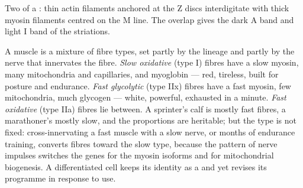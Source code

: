 \begin{omfigure}

{\small Two  of a : thin actin filaments anchored
at the Z discs interdigitate with thick myosin filaments centred on
the M line. The overlap gives the dark A band and light I band of
the striations.}
\end{omfigure}

\begin{proposition}\label{prop:b2:cell-differentiation:types}
A muscle is a mixture of fibre types, set partly by the 
lineage and partly by the nerve that innervates the fibre.
\emph{Slow oxidative} (type I) fibres have a slow myosin, many
mitochondria and capillaries, and myoglobin --- red, tireless,
built for posture and endurance. \emph{Fast glycolytic} (type IIx)
fibres have a fast myosin, few mitochondria, much glycogen ---
white, powerful, exhausted in a minute. \emph{Fast oxidative}
(type IIa) fibres lie between. A sprinter's calf is mostly fast
fibres, a marathoner's mostly slow, and the proportions are
heritable; but the type is not fixed: cross-innervating a fast
muscle with a slow nerve, or months of endurance training, converts
fibres toward the slow type, because the pattern of nerve impulses
switches the genes for the myosin isoforms and for mitochondrial
biogenesis. A differentiated cell keeps its identity as a  and yet revises its programme in response to use.
\end{proposition}

